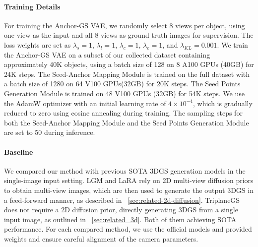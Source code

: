 \paragraph{Training Details}
For training the Anchor-GS VAE, we randomly select 8 views per object, using one view as the input and all 8 views as ground truth images for supervision. The loss weights are set as \(\lambda_s = 1\), \(\lambda_l = 1\), \(\lambda_c = 1\), \(\lambda_e = 1\), and \(\lambda_{KL} = 0.001\). We train the Anchor-GS VAE on a subset of our collected dataset containing approximately 40K objects, using a batch size of 128 on 8 A100 GPUs (40GB) for 24K steps. The Seed-Anchor Mapping Module is trained on the full dataset with a batch size of 1280 on 64 V100 GPUs(32GB) for 20K steps. The Seed Points Generation Module is trained on 48 V100 GPUs (32GB) for 54K steps.  We use the AdamW optimizer with an initial learning rate of \(4 \times 10^{-4}\), which is gradually reduced to zero using cosine annealing during training. The sampling steps for both the Seed-Anchor Mapping Module and the Seed Points Generation Module are set to 50 during inference.


\paragraph{Baseline}
We compared our method with previous SOTA 3DGS generation models in the single-image input setting. LGM and LaRA rely on 2D multi-view diffusion priors to obtain multi-view images, which are then used to generate the output 3DGS in a feed-forward manner, as described in ~\ref{sec:related-2d-diffusion}. TriplaneGS~\cite{zou2024triplane} does not require a 2D diffusion prior, directly generating 3DGS from a single input image, as outlined in ~\ref{sec:related_3d}. Both of them achieving SOTA performance. For each compared method, we use the official models and provided weights and ensure careful alignment of the camera parameters.

